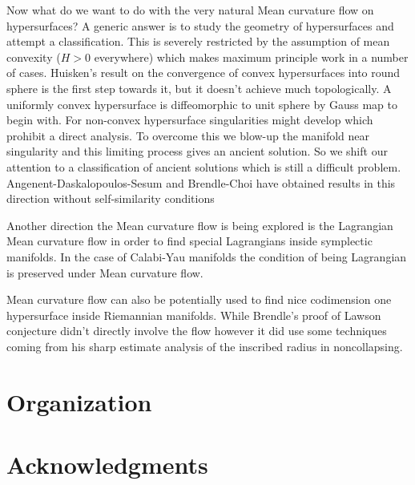 Now what do we want to do with the very natural Mean curvature flow on hypersurfaces? A generic answer is to study the geometry of hypersurfaces and attempt a classification. This is severely restricted by the assumption of mean convexity ($ H>0 $ everywhere) which makes maximum principle work in a number of cases. Huisken's result on the convergence of convex hypersurfaces into round sphere is the first step towards it, but it doesn't achieve much topologically. A uniformly convex hypersurface is diffeomorphic to unit sphere by Gauss map to begin with. For non-convex hypersurface singularities might develop which prohibit a direct analysis. To overcome this we blow-up the manifold near singularity and this limiting process gives an ancient solution. So we shift our attention to a classification of ancient solutions which is still a difficult problem. Angenent-Daskalopoulos-Sesum and Brendle-Choi have obtained results in this direction without self-similarity conditions

Another direction the Mean curvature flow is being explored is the Lagrangian Mean curvature flow in order to find special Lagrangians inside symplectic manifolds. In the case of Calabi-Yau manifolds the condition of being Lagrangian is preserved under Mean curvature flow.

Mean curvature flow can also be potentially used to find nice codimension one hypersurface inside Riemannian manifolds. While Brendle's proof of Lawson conjecture didn't directly involve the flow however it did use some techniques coming from his sharp estimate analysis of the inscribed radius in noncollapsing. 

\section*{Organization}

\section*{Acknowledgments}